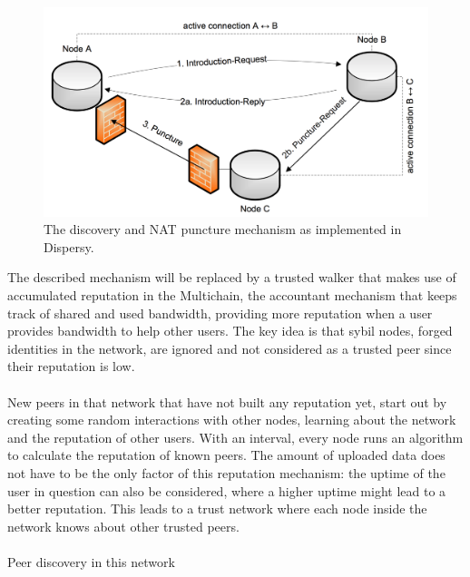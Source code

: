 \begin{figure}[h!]
	\centering
	\includegraphics[width=0.7\columnwidth]{images/architecture/dispersy_discover}
	\caption{The discovery and NAT puncture mechanism as implemented in Dispersy.}
	\label{fig:dispersy-discover}
\end{figure}

The described mechanism will be replaced by a trusted walker that makes use of accumulated reputation in the Multichain, the accountant mechanism that keeps track of shared and used bandwidth, providing more reputation when a user provides bandwidth to help other users. The key idea is that sybil nodes, forged identities in the network, are ignored and not considered as a trusted peer since their reputation is low.\\\\
New peers in that network that have not built any reputation yet, start out by creating some random interactions with other nodes, learning about the network and the reputation of other users. With an interval, every node runs an algorithm to calculate the reputation of known peers. The amount of uploaded data does not have to be the only factor of this reputation mechanism: the uptime of the user in question can also be considered, where a higher uptime might lead to a better reputation. This leads to a trust network where each node inside the network knows about other trusted peers.\\\\
Peer discovery in this network 

